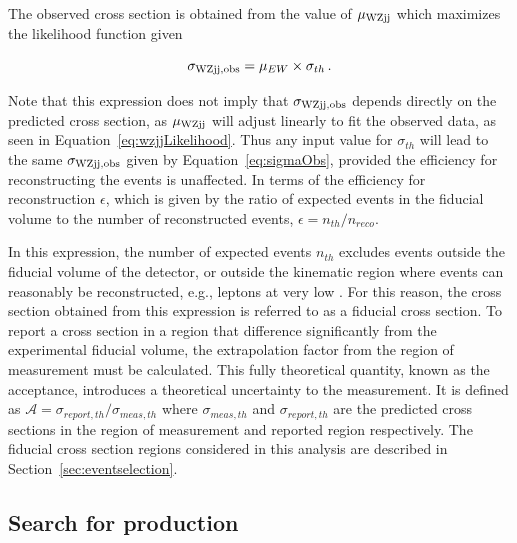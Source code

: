 The observed cross section is obtained from the value of $\mu_{\rm {WZjj}}$ 
which maximizes the likelihood function given

\begin{equation}
  \sigma_{\rm {WZjj} , obs} = \mu_{EW}\times\sigma_{th} \,.
  \label{eq:sigmaObs}
\end{equation}

Note that this expression does not imply that $\sigma_{\rm {WZjj}, obs}$
depends directly on the predicted cross section, as $\mu_{\rm {WZjj}}$ will adjust
linearly to fit the observed data, as seen in Equation~\ref{eq:wzjjLikelihood}.
Thus any input value for $\sigma_{th}$ will lead to the same $\sigma_{\rm {WZjj} , obs}$
given by Equation~\ref{eq:sigmaObs}, provided the efficiency for
reconstructing the events is unaffected. In terms of the efficiency for reconstruction
$\epsilon$, which is given by the ratio of expected events in the fiducial
volume to the number of reconstructed events,  $\epsilon = n_{th}/n_{reco}$.

In this expression, the number of expected events $n_{th}$ excludes events
outside the fiducial volume of the detector, or outside the kinematic region
where events can reasonably be reconstructed, e.g., leptons at very low \pt.
For this reason, the cross section obtained from this expression is referred to 
as a fiducial cross section.
To report a cross section in a region that difference significantly from the 
experimental fiducial volume, the extrapolation factor from the region
of measurement must be calculated. This fully theoretical quantity, known
as the acceptance, introduces a theoretical uncertainty to the measurement.
It is defined as $\mathcal{A} = \sigma_{report, th}/\sigma_{meas, th}$ where
$\sigma_{meas, th}$ and $\sigma_{report, th}$ are the predicted cross sections
in the region of measurement and reported region respectively. The fiducial
cross section regions considered in this analysis are described in Section~\ref{sec:eventselection}.

\subsection{Search for \EWWZ production}

